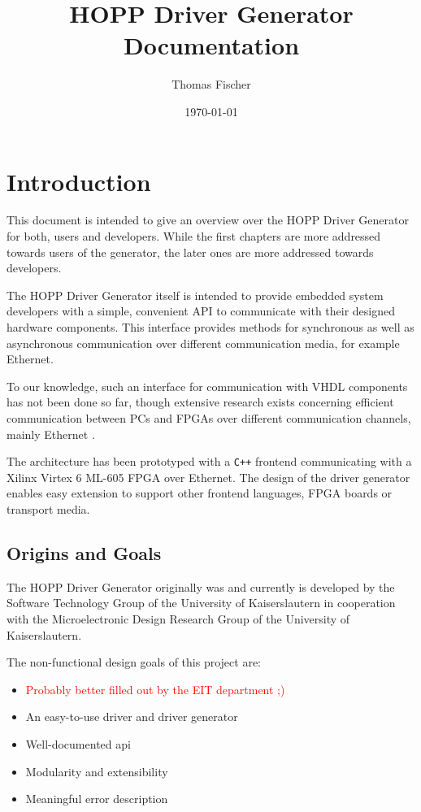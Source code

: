 \documentclass{report}
\begin{document}
\title{HOPP Driver Generator Documentation}
\author{Thomas Fischer}
\date{\today}

\maketitle
\thispagestyle{empty}
\newpage

\tableofcontents
\thispagestyle{empty}
\newpage


\chapter{Introduction}
\label{sec:intro}
This document is intended to give an overview over the HOPP Driver Generator for both, users and developers. While the first chapters are more addressed towards users of the generator, the later ones are more addressed towards developers. 

The HOPP Driver Generator itself is intended to provide embedded system developers %
with a simple, convenient API to communicate with their designed hardware components. %
This interface provides methods for synchronous as well as asynchronous communication over different communication media, for example Ethernet.

To our knowledge, such an interface for communication with VHDL components has not been done so far, though extensive research exists concerning efficient communication between PCs and FPGAs over different communication channels, mainly Ethernet \cite{lofgren05, alachiotis10, alachiotis12}.

The architecture has been prototyped with a \texttt{C++} frontend communicating with a Xilinx Virtex 6 ML-605 FPGA over Ethernet. The design of the driver generator enables easy extension to support other frontend languages, FPGA boards or transport media.

\section{Origins and Goals}
\label{sec:goals}
The HOPP Driver Generator originally was and currently is developed by the Software Technology Group of the University of Kaiserslautern in cooperation with the Microelectronic Design Research Group of the University of Kaiserslautern.

The non-functional design goals of this project are:

\begin{itemize}
\item \textcolor{red}{Probably better filled out by the EIT department ;)}
\item An easy-to-use driver and driver generator
\item Well-documented api
\item Modularity and extensibility
\item Meaningful error description
\end{itemize}
\end{document}
